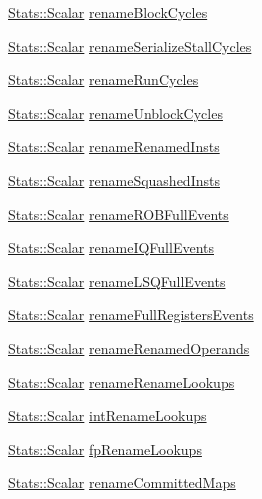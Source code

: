 \begin{DoxyCompactItemize}
\item 
\hyperlink{classStats_1_1Scalar}{Stats::Scalar} \hyperlink{classDefaultRename_a45732215f002b5052d042ef5798735f0}{renameBlockCycles}
\item 
\hyperlink{classStats_1_1Scalar}{Stats::Scalar} \hyperlink{classDefaultRename_a712d72379bc583c374e2f6179e8ee58f}{renameSerializeStallCycles}
\item 
\hyperlink{classStats_1_1Scalar}{Stats::Scalar} \hyperlink{classDefaultRename_a7dd03c8b7a88da84ff7e1bdd6b938d47}{renameRunCycles}
\item 
\hyperlink{classStats_1_1Scalar}{Stats::Scalar} \hyperlink{classDefaultRename_a2f14c493f619ee24a84fbe959ed72a97}{renameUnblockCycles}
\item 
\hyperlink{classStats_1_1Scalar}{Stats::Scalar} \hyperlink{classDefaultRename_aee6bb4587ea6f254fc29dda4d565afc9}{renameRenamedInsts}
\item 
\hyperlink{classStats_1_1Scalar}{Stats::Scalar} \hyperlink{classDefaultRename_ae988aa97bbfa339fc6e6bf0cbad90832}{renameSquashedInsts}
\item 
\hyperlink{classStats_1_1Scalar}{Stats::Scalar} \hyperlink{classDefaultRename_a41408b25638b2531bc9e3b6ee622d148}{renameROBFullEvents}
\item 
\hyperlink{classStats_1_1Scalar}{Stats::Scalar} \hyperlink{classDefaultRename_a9a4bab1aece13e48ae2d2a3f247b3354}{renameIQFullEvents}
\item 
\hyperlink{classStats_1_1Scalar}{Stats::Scalar} \hyperlink{classDefaultRename_aba431e021496d1070a1d8f9ad7ec71f2}{renameLSQFullEvents}
\item 
\hyperlink{classStats_1_1Scalar}{Stats::Scalar} \hyperlink{classDefaultRename_ac012d0908acb20c3f68593787f626711}{renameFullRegistersEvents}
\item 
\hyperlink{classStats_1_1Scalar}{Stats::Scalar} \hyperlink{classDefaultRename_a3e2c435288350f7d805557b4d1a2b7a5}{renameRenamedOperands}
\item 
\hyperlink{classStats_1_1Scalar}{Stats::Scalar} \hyperlink{classDefaultRename_ab0b7632e67fcf2fe1e6bb1cef111eda4}{renameRenameLookups}
\item 
\hyperlink{classStats_1_1Scalar}{Stats::Scalar} \hyperlink{classDefaultRename_ae2548cb038c1868f0dcf4c5df1154b12}{intRenameLookups}
\item 
\hyperlink{classStats_1_1Scalar}{Stats::Scalar} \hyperlink{classDefaultRename_ad27b51042b9dc458c5dd63b8c5f8d467}{fpRenameLookups}
\item 
\hyperlink{classStats_1_1Scalar}{Stats::Scalar} \hyperlink{classDefaultRename_a5d4c3559dbd988f18cc6d1c0e0470fcb}{renameCommittedMaps}

\end{DoxyCompactItemize}
